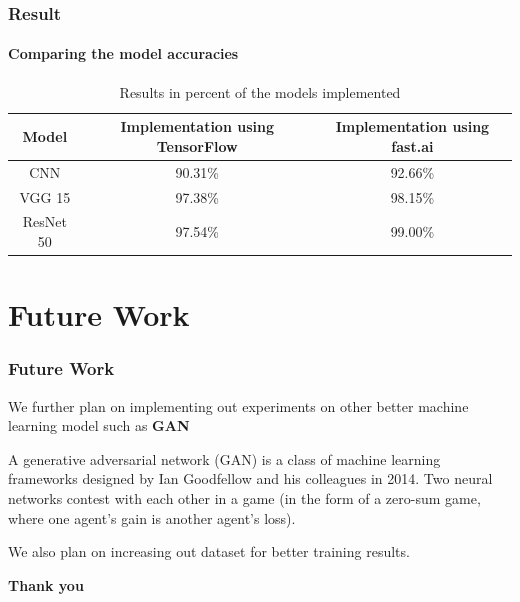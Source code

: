 \documentclass[10pt, aspectratio=169]{beamer}
\begin{document}
	\begin{frame}
		\frametitle{Result}
		\framesubtitle{Comparing the model accuracies}

		\begin{table}
			\begin{center}
				\begin{tabular}{| c | c | c |}
					\hline
					Model & Implementation using TensorFlow & Implementation using
					fast.ai \\
					\hline
					CNN & 90.31\% & 92.66\% \\
					\hline
					VGG 15 & 97.38\% & 98.15\% \\
					\hline
					ResNet 50 & 97.54\% & 99.00\% \\
					\hline
				\end{tabular}
				\caption{Results in percent of the models implemented}
			\end{center}
	\end{table}
	\end{frame}

	\section{Future Work}
	\begin{frame}
		\frametitle{Future Work}

		We further plan on implementing out experiments on other better machine
		learning model such as \textbf{GAN}

		\vspace{0.5cm}

		A generative adversarial network (GAN) is a class of machine learning
		frameworks designed by Ian Goodfellow and his colleagues in 2014. Two
		neural networks contest with each other in a game (in the form of a
		zero-sum game, where one agent's gain is another agent's loss).

		\vspace{0.5cm}

		We also plan on increasing out dataset for better training results.
	\end{frame}

	\begin{frame}
		\centering
		\textbf{\Huge Thank you}
	\end{frame}
\end{document}

